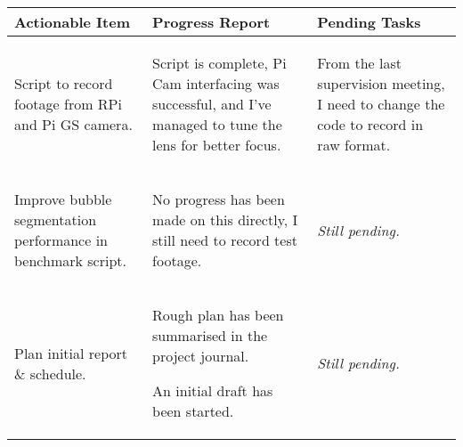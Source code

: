 \begin{table}[!h]
    \centering
    \begin{tabularx}{\textwidth}{|X|X|X|}
        \hline
        Actionable Item & Progress Report & Pending Tasks \\
        \hline
        \hline
        \begin{myitemize}
            \item Script to record footage from RPi and Pi GS camera.
        \end{myitemize} & 
        \begin{myitemize}
            \item Script is complete, Pi Cam interfacing was successful, and I've managed to tune the lens for better focus.
        \end{myitemize} & 
        \begin{myitemize}
            \item From the last supervision meeting, I need to change the code to record in raw format.
        \end{myitemize} \\
        \hline
        \begin{myitemize}
            \item Improve bubble segmentation performance in benchmark script.
        \end{myitemize} & 
        \begin{myitemize}
            \item No progress has been made on this directly, I still need to record test footage.
        \end{myitemize} & 
        \begin{myitemize}
            \item \textit{Still pending.}
        \end{myitemize} \\
        \hline
        \begin{myitemize}
            \item Plan initial report \& schedule.
        \end{myitemize} & 
        \begin{myitemize}
            \item Rough plan has been summarised in the project journal.
            \item An initial draft has been started.
        \end{myitemize} & 
        \begin{myitemize}
            \item \textit{Still pending.}
        \end{myitemize} \\
        \hline
    \end{tabularx}
\end{table}
